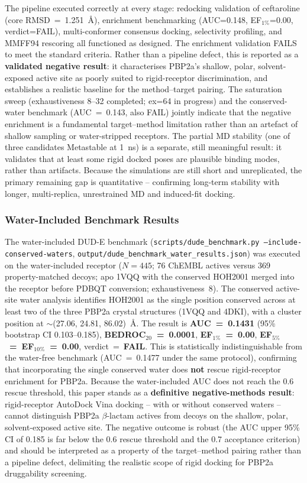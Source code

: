 \documentclass[12pt]{article}
\begin{document}
The pipeline executed correctly at every stage: redocking validation of ceftaroline (core RMSD~=~\SI{1.251}{\angstrom}), enrichment benchmarking (AUC=0.148, EF$_{1\%}$=0.00, verdict=FAIL), multi-conformer consensus docking, selectivity profiling, and MMFF94 rescoring all functioned as designed. The enrichment validation FAILS to meet the standard criteria. Rather than a pipeline defect, this is reported as a \textbf{validated negative result}: it characterises PBP2a's shallow, polar, solvent-exposed active site as poorly suited to rigid-receptor discrimination, and establishes a realistic baseline for the method--target pairing. The saturation sweep (exhaustiveness 8--32 completed; ex=64 in progress) and the conserved-water benchmark (AUC~=~0.143, also FAIL) jointly indicate that the negative enrichment is a fundamental target--method limitation rather than an artefact of shallow sampling or water-stripped receptors. The partial MD stability (one of three candidates Metastable at 1~ns) is a separate, still meaningful result: it validates that at least some rigid docked poses are plausible binding modes, rather than artifacts. Because the simulations are still short and unreplicated, the primary remaining gap is quantitative -- confirming long-term stability with longer, multi-replica, unrestrained MD and induced-fit docking.

\subsubsection{Water-Included Benchmark Results}
\label{subsec:water_benchmark}
The water-included DUD-E benchmark (\texttt{scripts/dude\_benchmark.py --include-conserved-waters}, \texttt{output/dude\_benchmark\_water\_results.json}) was executed on the water-included receptor ($N{=}445$; 76 ChEMBL actives versus 369 property-matched decoys; apo 1VQQ with the conserved HOH2001 merged into the receptor before PDBQT conversion; exhaustiveness~8). The conserved active-site water analysis identifies HOH2001 as the single position conserved across at least two of the three PBP2a crystal structures (1VQQ and 4DKI), with a cluster position at $\sim$(27.06, 24.81, 86.02)~\si{\angstrom}. The result is \textbf{AUC~=~0.1431} (95\% bootstrap CI 0.103--0.185), \textbf{BEDROC$_{20}$~=~0.0001}, \textbf{EF$_{1\%}$~=~0.00}, \textbf{EF$_{5\%}$~=~EF$_{10\%}$~=~0.00}, verdict~=~\textbf{FAIL}. This is statistically indistinguishable from the water-free benchmark (AUC~=~0.1477 under the same protocol), confirming that incorporating the single conserved water does {\bf not} rescue rigid-receptor enrichment for PBP2a. Because the water-included AUC does not reach the 0.6 rescue threshold, this paper stands as a \textbf{definitive negative-methods result}: rigid-receptor AutoDock Vina docking -- with or without conserved waters -- cannot distinguish PBP2a $\beta$-lactam actives from decoys on the shallow, polar, solvent-exposed active site. The negative outcome is robust (the AUC upper 95\% CI of 0.185 is far below the 0.6 rescue threshold and the 0.7 acceptance criterion) and should be interpreted as a property of the target--method pairing rather than a pipeline defect, delimiting the realistic scope of rigid docking for PBP2a druggability screening.
\end{document}
